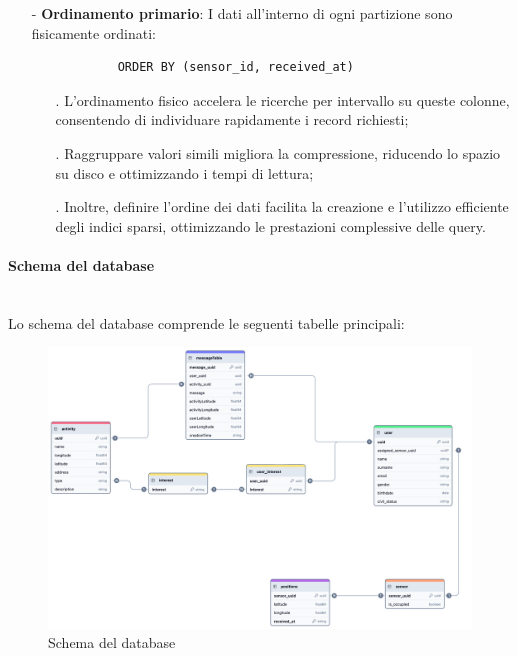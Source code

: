 \documentclass[10pt]{article}
\newcommand{\myparagraph}[1]{\paragraph{#1}\mbox{}\\}
\begin{document}
\begin{itemize}
            \item[-] \textbf{Ordinamento primario}: I dati all'interno di ogni partizione sono fisicamente ordinati:
            \begin{lstlisting}
            ORDER BY (sensor_id, received_at)
            \end{lstlisting}
            \begin{itemize}
                \item[.] L'ordinamento fisico accelera le ricerche per intervallo su queste colonne, consentendo di individuare rapidamente i record richiesti;
                \item[.] Raggruppare valori simili migliora la compressione, riducendo lo spazio su disco e ottimizzando i tempi di lettura;
                \item[.] Inoltre, definire l'ordine dei dati facilita la creazione e l'utilizzo efficiente degli indici sparsi, ottimizzando le prestazioni complessive delle query.
            \end{itemize}         
        \end{itemize}

        \myparagraph{Schema del database}
        Lo schema del database comprende le seguenti tabelle principali:

        \begin{figure}[H]
        \hspace{-1.5cm}
        \includegraphics[width=1.25\textwidth]{SchemaDB.png}
        \caption{Schema del database}
        \end{figure}
\end{document}
